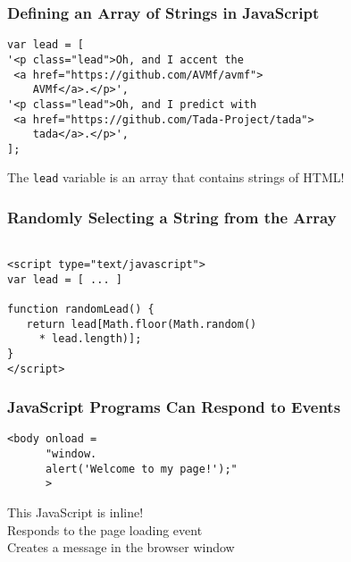 \documentclass[14pt,aspectratio=169]{beamer}
\begin{document}
%
\begin{frame}[fragile]
  \frametitle{Defining an Array of Strings in JavaScript}
  \normalsize
  \begin{minipage}{6in}
    \vspace*{.2in}
    \begin{verbatim}
var lead = [
'<p class="lead">Oh, and I accent the
 <a href="https://github.com/AVMf/avmf">
    AVMf</a>.</p>',
'<p class="lead">Oh, and I predict with
 <a href="https://github.com/Tada-Project/tada">
    tada</a>.</p>',
];
    \end{verbatim}
  \end{minipage}
  \vspace*{.1in}
  \begin{center}
    The {\tt lead} variable is an array that contains strings of HTML!
  \end{center}
\end{frame}

%
\begin{frame}[fragile]
  \frametitle{Randomly Selecting a String from the Array}
  \normalsize
  \begin{minipage}{6in}
    \vspace*{.2in}
    \begin{verbatim}

<script type="text/javascript">
var lead = [ ... ]

function randomLead() {
   return lead[Math.floor(Math.random()
     * lead.length)];
}
</script>

    \end{verbatim}
  \end{minipage}
\end{frame}

%
\begin{frame}[fragile]
  \frametitle{JavaScript Programs Can Respond to Events}
  \normalsize
  \begin{minipage}{6in}
    \vspace*{.2in}
    \begin{verbatim}
<body onload =
      "window.
      alert('Welcome to my page!');"
      >
    \end{verbatim}
  \end{minipage}
  \vspace*{.1in}
  \begin{center}
    This JavaScript is inline! \\
    Responds to the page loading event \\
    Creates a message in the browser window \\
  \end{center}

\end{frame}
\end{document}
